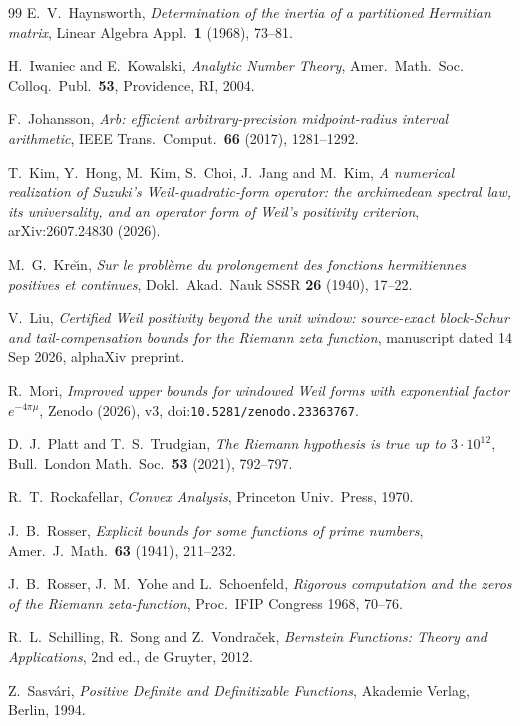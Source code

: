 \documentclass[10pt]{amsart}
\theoremstyle{definition}
\theoremstyle{remark}
\begin{document}
\begin{thebibliography}{99}
 E.~V.~Haynsworth, \emph{Determination of the inertia of a partitioned Hermitian
matrix}, Linear Algebra Appl.\ \textbf{1} (1968), 73--81.

 H.~Iwaniec and E.~Kowalski, \emph{Analytic Number Theory}, Amer.\ Math.\ Soc.
Colloq.\ Publ.\ \textbf{53}, Providence, RI, 2004.

 F.~Johansson, \emph{Arb: efficient arbitrary-precision midpoint-radius interval
arithmetic}, IEEE Trans.\ Comput.\ \textbf{66} (2017), 1281--1292.

 T.~Kim, Y.~Hong, M.~Kim, S.~Choi, J.~Jang and M.~Kim, \emph{A numerical realization of Suzuki's Weil-quadratic-form operator: the archimedean spectral law, its universality, and an operator form of Weil's positivity criterion}, arXiv:2607.24830 (2026).

 M.~G.~Kre\u{\i}n, \emph{Sur le probl\`eme du prolongement des fonctions
hermitiennes positives et continues}, Dokl.~Akad.~Nauk SSSR \textbf{26} (1940), 17--22.

 V.~Liu, \emph{Certified Weil positivity beyond the unit window: source-exact
block-Schur and tail-compensation bounds for the Riemann zeta function}, manuscript dated 14 Sep 2026,
alphaXiv preprint.

 R.~Mori, \emph{Improved upper bounds for windowed Weil forms with exponential factor
$e^{-4\pi\mu}$}, Zenodo (2026), v3, doi:\nolinkurl{10.5281/zenodo.23363767}.

 D.~J.~Platt and T.~S.~Trudgian, \emph{The Riemann hypothesis is true up to
$3\cdot10^{12}$}, Bull.\ London Math.\ Soc.\ \textbf{53} (2021), 792--797.

 R.~T.~Rockafellar, \emph{Convex Analysis}, Princeton Univ.~Press, 1970.

 J.~B.~Rosser, \emph{Explicit bounds for some functions of prime numbers}, Amer.\ J.\
Math.\ \textbf{63} (1941), 211--232.

 J.~B.~Rosser, J.~M.~Yohe and L.~Schoenfeld, \emph{Rigorous computation and
the zeros of the Riemann zeta-function}, Proc.\ IFIP Congress 1968, 70--76.

 R.~L.~Schilling, R.~Song and Z.~Vondra\v{c}ek, \emph{Bernstein Functions:
Theory and Applications}, 2nd ed., de Gruyter, 2012.

 Z.~Sasv\'ari, \emph{Positive Definite and Definitizable Functions},
Akademie Verlag, Berlin, 1994.


\end{thebibliography}
\end{document}
